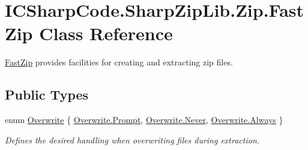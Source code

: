 \hypertarget{class_i_c_sharp_code_1_1_sharp_zip_lib_1_1_zip_1_1_fast_zip}{}\section{I\+C\+Sharp\+Code.\+Sharp\+Zip\+Lib.\+Zip.\+Fast\+Zip Class Reference}
\label{class_i_c_sharp_code_1_1_sharp_zip_lib_1_1_zip_1_1_fast_zip}


\hyperlink{class_i_c_sharp_code_1_1_sharp_zip_lib_1_1_zip_1_1_fast_zip}{Fast\+Zip} provides facilities for creating and extracting zip files.  


\subsection*{Public Types}
\begin{DoxyCompactItemize}
\item 
enum \hyperlink{class_i_c_sharp_code_1_1_sharp_zip_lib_1_1_zip_1_1_fast_zip_a9befc960dd9a0ca2645a8677f77f6e8c}{Overwrite} \{ \hyperlink{class_i_c_sharp_code_1_1_sharp_zip_lib_1_1_zip_1_1_fast_zip_a9befc960dd9a0ca2645a8677f77f6e8ca45d74bdb9de5d4f07a7b7eefac42610a}{Overwrite.\+Prompt}, 
\hyperlink{class_i_c_sharp_code_1_1_sharp_zip_lib_1_1_zip_1_1_fast_zip_a9befc960dd9a0ca2645a8677f77f6e8ca6e7b34fa59e1bd229b207892956dc41c}{Overwrite.\+Never}, 
\hyperlink{class_i_c_sharp_code_1_1_sharp_zip_lib_1_1_zip_1_1_fast_zip_a9befc960dd9a0ca2645a8677f77f6e8ca68eec46437c384d8dad18d5464ebc35c}{Overwrite.\+Always}
 \}\begin{DoxyCompactList}\small\item\em Defines the desired handling when overwriting files during extraction. \end{DoxyCompactList}
\end{DoxyCompactItemize}
